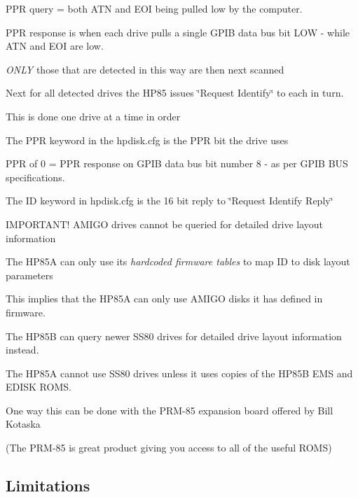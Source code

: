 \begin{DoxyItemize}
\begin{DoxyItemize}
\item P\+PR query = both A\+TN and E\+OI being pulled low by the computer.
\item P\+PR response is when each drive pulls a single G\+P\+IB data bus bit L\+OW -\/ while A\+TN and E\+OI are low.
\begin{DoxyItemize}
\item {\itshape O\+N\+LY} those that are detected in this way are then next scanned
\end{DoxyItemize}
\item Next for all detected drives the H\+P85 issues \char`\"{}\+Request Identify\char`\"{} to each in turn.
\begin{DoxyItemize}
\item This is done one drive at a time in order
\item The P\+PR keyword in the hpdisk.\+cfg is the P\+PR bit the drive uses
\begin{DoxyItemize}
\item P\+PR of 0 = P\+PR response on G\+P\+IB data bus bit number 8 -\/ as per G\+P\+IB B\+US specifications.
\end{DoxyItemize}
\item The ID keyword in hpdisk.\+cfg is the 16 bit reply to \char`\"{}\+Request Identify Reply\char`\"{}
\begin{DoxyItemize}
\item I\+M\+P\+O\+R\+T\+A\+N\+T! A\+M\+I\+GO drives cannot be queried for detailed drive layout information
\begin{DoxyItemize}
\item The H\+P85A can only use its {\itshape hardcoded firmware tables} to map ID to disk layout parameters
\item This implies that the H\+P85A can only use A\+M\+I\+GO disks it has defined in firmware.
\end{DoxyItemize}
\item The H\+P85B can query newer S\+S80 drives for detailed drive layout information instead.
\item The H\+P85A cannot use S\+S80 drives unless it uses copies of the H\+P85B E\+MS and E\+D\+I\+SK R\+O\+MS.
\begin{DoxyItemize}
\item One way this can be done with the P\+R\+M-\/85 expansion board offered by Bill Kotaska
\begin{DoxyItemize}
\item (The P\+R\+M-\/85 is great product giving you access to all of the useful R\+O\+MS) 

 \subsection*{Limitations}
\end{DoxyItemize}
\end{DoxyItemize}
\end{DoxyItemize}
\end{DoxyItemize}
\end{DoxyItemize}
\end{DoxyItemize}

